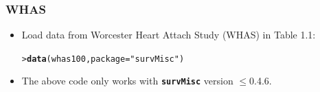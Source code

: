 \documentclass[10pt]{beamer}\usepackage[]{graphicx}\usepackage[]{color}
\makeatletter
\newcommand{\hlstr}[1]{\textcolor[rgb]{0.192,0.494,0.8}{#1}}%
\newcommand{\hlstd}[1]{\textcolor[rgb]{0.345,0.345,0.345}{#1}}%
\newcommand{\hlkwc}[1]{\textcolor[rgb]{0.333,0.667,0.333}{#1}}%
\newcommand{\hlkwd}[1]{\textcolor[rgb]{0.737,0.353,0.396}{\textbf{#1}}}%
\newenvironment{kframe}{%
 \def\at@end@of@kframe{}%
 \ifinner\ifhmode%
  \def\at@end@of@kframe{\end{minipage}}%
  \begin{minipage}{\columnwidth}%
 \fi\fi%
 \def\FrameCommand##1{\hskip\@totalleftmargin \hskip-\fboxsep
 \colorbox{shadecolor}{##1}\hskip-\fboxsep
     \hskip-\linewidth \hskip-\@totalleftmargin \hskip\columnwidth}%
 \MakeFramed {\advance\hsize-\width
   \@totalleftmargin\z@ \linewidth\hsize
   \@setminipage}}%
 {\par\unskip\endMakeFramed%
 \at@end@of@kframe}
\newenvironment{knitrout}{}{} %
\renewenvironment{knitrout}{\setlength{\topsep}{-.2mm}}{}
\newcommand{\pkg}[1]{{\textbf{\texttt{#1}}}}
\makeatother
\begin{document}
\begin{frame}[fragile]
  \frametitle{WHAS}
  \begin{itemize}
  \item Load data from Worcester Heart Attach Study (WHAS) in Table 1.1:
\begin{knitrout}\scriptsize
{}\color{fgcolor}\begin{kframe}
\begin{alltt}
\hlstd{> }\hlkwd{data}\hlstd{(whas100,} \hlkwc{package} \hlstd{=} \hlstr{"survMisc"}\hlstd{)}
\end{alltt}
\end{kframe}
\end{knitrout}
  \item The above code only works with \pkg{survMisc} version $\le$0.4.6.


\end{itemize}
\end{frame}
\end{document}
